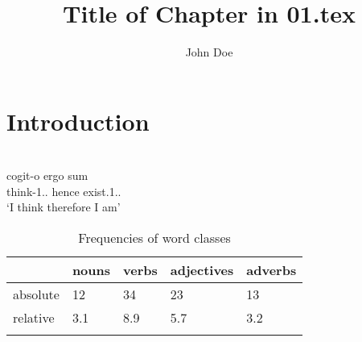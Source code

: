 \documentclass[output=paper]{LSP/langsci}
\author{John Doe}
\title{Title of Chapter in 01.tex}
\begin{document}
\section{Introduction} 
 
 \citet{Chomsky1957}
\ea\label{ex:1:descartes}
\\
\gll cogit-o ergo sum \\
     think-1{\sg}.{\prs}.{\ind} hence exist.1{\sg}.{\prs}.{\ind}\\
\glt `I think therefore I am'
\z

\begin{table}
\caption{Frequencies of word classes}
\label{tab:1:frequencies}
 \begin{tabular}{lllll} %
  \lsptoprule
            & nouns & verbs & adjectives & adverbs\\ %
  \midrule
  absolute  &   12 &    34  &    23     & 13\\
  relative  &   3.1 &   8.9 &    5.7    & 3.2\\
  \lspbottomrule
 \end{tabular}
\end{table}



 \lipsum 


\printbibliography[heading=subbibliography,notkeyword=this]
\end{document}
